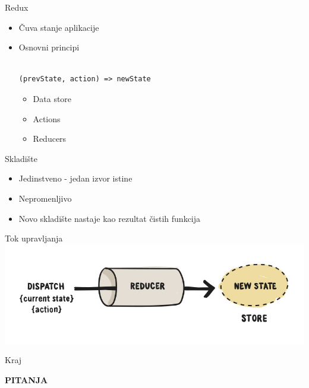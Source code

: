 \documentclass{beamer}
\begin{document}
\begin{frame}[fragile]{Redux}
    \begin{itemize}
    	\item Čuva stanje aplikacije
    	\item Osnovni principi
    \begin{verbatim}
    	
(prevState, action) => newState
    	\end{verbatim}
    	\begin{itemize}
    		\item Data store
    		\item Actions
    		\item Reducers    	
    	\end{itemize} 
    \end{itemize}
\end{frame}
\begin{frame}{Skladište}
    \begin{itemize}
    	\item Jedinstveno - jedan izvor istine
    	\item Nepromenljivo 
    	\item Novo skladište nastaje kao rezultat čistih funkcija
    \end{itemize}

\end{frame}

\begin{frame}{Tok upravljanja}
      \includegraphics[scale=0.5]{./resources/redux.jpg}
\end{frame}

	
\begin{frame}{Kraj}
     \begin{center}
           \textbf{PITANJA}
	 \end{center} 
\end{frame}


\end{document}
